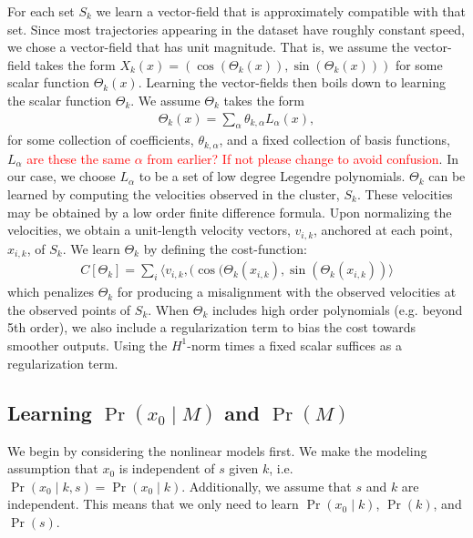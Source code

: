 \documentclass[letterpaper,10pt,conference]{ieeeconf}
\newcommand{\Ram}[1]{\textcolor{red}{#1}}
\begin{document}
  For each set $S_k$ we learn a vector-field that is approximately compatible with that set.
  Since most trajectories appearing in the dataset have roughly constant speed, we chose a vector-field that has unit magnitude. 
  That is, we assume the vector-field takes the form $X_k(x) = \left( \cos( \Theta_k(x) ) , \sin(\Theta_k(x)) \right)$ for some scalar function $\Theta_k(x)$.
  Learning the vector-fields then boils down to learning the scalar function $\Theta_k$.
  We assume $\Theta_k$ takes the form
  \begin{align*}
  	\Theta_k(x) = \sum_{\alpha} \theta_{k,\alpha} L_{\alpha}(x),
  \end{align*}
  for some collection of coefficients, $\theta_{k,\alpha}$, and a fixed collection of basis functions, $L_{\alpha}$ \Ram{are these the same $\alpha$ from earlier? If not please change to avoid confusion}.
  In our case, we choose $L_{\alpha}$ to be a set of low degree Legendre polynomials.
 $\Theta_k$ can be learned by computing the velocities observed in the cluster, $S_k$.
  These velocities may be obtained by a low order finite difference formula.
  Upon normalizing the velocities, we obtain a unit-length velocity vectors, $v_{i,k}$, anchored at each point, $x_{i,k}$, of $S_k$.
  We learn $\Theta_k$ by defining the cost-function:
  \begin{align*}
  	C[ \Theta_k] = \sum_i \langle v_{i,k} , ( \cos(\Theta_k( x_{i,k}) , \sin( \Theta_k( x_{i,k} ) ) \rangle
  \end{align*}
  which penalizes $\Theta_k$ for producing a misalignment with the observed velocities at the observed points of $S_k$.
  When $\Theta_{k}$ includes high order polynomials (e.g. beyond 5th order), we also include a regularization term to bias the cost towards smoother outputs.
  Using the $H^1$-norm times a fixed scalar suffices as a regularization term. 
  
  \subsection{Learning $\Pr( x_0 \mid M)$ and $\Pr(M)$}
  
  We begin by considering the nonlinear models first.
  We make the modeling assumption that $x_0$ is independent of $s$ given $k$, i.e. $\Pr( x_0 \mid k,s) = \Pr(x_0 \mid k)$.
  Additionally, we assume that $s$ and $k$ are independent.
  This means that we only need to learn $\Pr( x_0 \mid k)$, $\Pr(k)$, and $\Pr(s)$.
  
\end{document}
